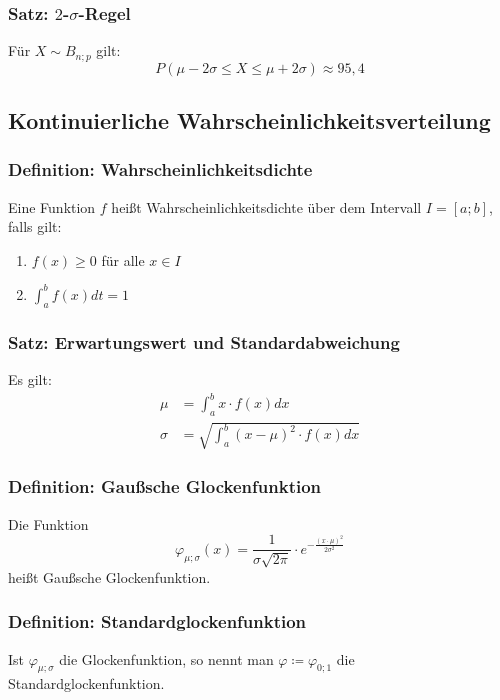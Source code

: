 \documentclass{article}
\begin{document}
  \subsubsection{Satz: $2$-$\sigma$-Regel}
  Für $X \sim B_{n;p}$ gilt: 
  \begin{equation*}
  	P(\mu - 2\sigma \leqslant X \leqslant \mu + 2\sigma) \approx 95,4%
  \end{equation*}
  
  \subsection{Kontinuierliche Wahrscheinlichkeitsverteilung}
  
  \subsubsection{Definition: Wahrscheinlichkeitsdichte}
  Eine Funktion $f$ heißt Wahrscheinlichkeitsdichte über dem Intervall $I = [a;b]$, falls gilt: 
  \begin{enumerate}
  	\item $f(x) \geqslant 0$ für alle $x \in I$
  	\item $\int^b_a f(x) dt = 1$
  \end{enumerate}
  
  \subsubsection{Satz: Erwartungswert und Standardabweichung}
  Es gilt: 
  \begin{align*}
  	\mu &= \int^b_a x \cdot f(x) dx \\
  	\sigma &= \sqrt{\int^b_a (x - \mu)^2 \cdot f(x) dx}
  \end{align*}
  
  \subsubsection{Definition: Gaußsche Glockenfunktion}
  Die Funktion 
  \begin{equation*}
  	\varphi_{\mu;\sigma}(x) = \frac{1}{\sigma \sqrt{2\pi}} \cdot e^{-\frac{(x \cdot \mu)^2}{2 \sigma^2}} 
  \end{equation*}
  	heißt Gaußsche Glockenfunktion. 
  	
  	\subsubsection{Definition: Standardglockenfunktion}
  	Ist $\varphi_{\mu; \sigma}$ die Glockenfunktion, so nennt man $\varphi \coloneqq \varphi_{0;1}$ die Standardglockenfunktion.
  	
\end{document}
